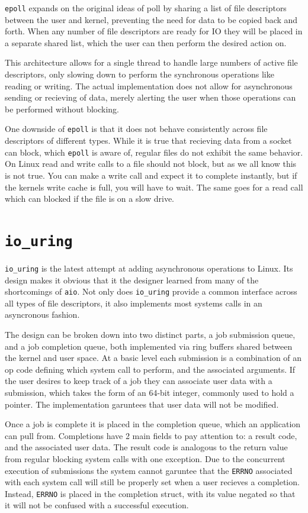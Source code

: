 \documentclass[letterpaper, 10pt, twocolumn]{article}
\begin{document}
\texttt{epoll} expands on the original ideas of poll by sharing a list of file descriptors between the user and kernel, preventing the need for data to be copied back and forth. When any number of file descriptors are ready for IO they will be placed in a separate shared list, which the user can then perform the desired action on.

This architecture allows for a single thread to handle large numbers of active file descriptors, only slowing down to perform the synchronous operations like reading or writing. The actual implementation does not allow for asynchronous sending or recieving of data, merely alerting the user when those operations can be performed without blocking.

One downside of \texttt{epoll} is that it does not behave consistently across file descriptors of different types. While it is true that recieving data from a socket can block, which \texttt{epoll} is aware of, regular files do not exhibit the same behavior. On Linux read and write calls to a file should not block, but as we all know this is not true. You can make a write call and expect it to complete instantly, but if the kernels write cache is full, you will have to wait. The same goes for a read call which can blocked if the file is on a slow drive.

\section{\texttt{io\_uring}}
\label{sec:orgce2394e}
\texttt{io\_uring} is the latest attempt at adding asynchronous operations to Linux. Its design makes it obvious that it the designer learned from many of the shortcomings of \texttt{aio}. Not only does \texttt{io\_uring} provide a common interface across all types of file descriptors, it also implements most systems calls in an asyncronous fashion.

The design can be broken down into two distinct parts, a job submission queue, and a job completion queue, both implemented via ring buffers shared between the kernel and user space. At a basic level each submission is a combination of an op code defining which system call to perform, and the associated arguments. If the user desires to keep track of a job they can associate user data with a submission, which takes the form of an 64-bit integer, commonly used to hold a pointer. The implementation garuntees that user data will not be modified.

Once a job is complete it is placed in the completion queue, which an application can pull from. Completions have 2 main fields to pay attention to: a result code, and the associated user data. The result code is analogous to the return value from regular blocking system calls with one exception. Due to the concurrent execution of submissions the system cannot garuntee that the \texttt{ERRNO} associated with each system call will still be properly set when a user recieves a completion. Instead, \texttt{ERRNO} is placed in the completion struct, with its value negated so that it will not be confused with a successful execution.
\end{document}
